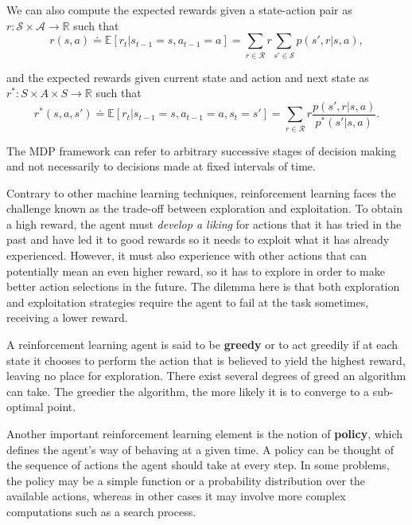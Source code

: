 \documentclass[11pt]{article}
\theoremstyle{definition}
\begin{document}
We can also compute the expected rewards given a state-action pair as $r: \mathcal{S} \times \mathcal{A} \rightarrow \mathbb{R}$ such that
\begin{equation*}
    r(s, a) \doteq \mathbb{E}[r_t | s_{t-1} = s, a_{t-1} = a] = \sum_{r \in \mathcal{R}} r \sum_{s' \in \mathcal{S}} p(s', r | s, a),
\end{equation*}

and the expected rewards given current state and action and next state as $r^* : S \times A \times S \rightarrow \mathbb{R}$ such that
\begin{equation*}
    r^*(s, a, s') \doteq \mathbb{E}[r_t | s_{t-1} = s, a_{t-1} = a, s_t = s'] = \sum_{r \in \mathcal{R}} r \dfrac{p(s', r | s, a)}{p^*(s' | s, a)}.
\end{equation*}

The MDP framework can refer to arbitrary successive stages of decision making and not necessarily to decisions made at fixed intervals of time. 

Contrary to other machine learning techniques, reinforcement learning faces the challenge known as the trade-off between exploration and exploitation. To obtain a high reward, the agent must \textit{develop a liking} for actions that it has tried in the past and have led it to good rewards so it needs to exploit what it has already experienced. However, it must also experience with other actions that can potentially mean an even higher reward, so it has to explore in order to make better action selections in the future. The dilemma here is that both exploration and exploitation strategies require the agent to fail at the task sometimes, receiving a lower reward.

A reinforcement learning agent is said to be \textbf{greedy} or to act greedily if at each state it chooses to perform the action that is believed to yield the highest reward, leaving no place for exploration. There exist several degrees of greed an algorithm can take. The greedier the algorithm, the more likely it is to converge to a sub-optimal point.

Another important reinforcement learning element is the notion of \textbf{policy}, which defines the agent's way of behaving at a given time. A policy can be thought of the sequence of actions the agent should take at every step. In some problems, the policy may be a simple function or a probability distribution over the available actions, whereas in other cases it may involve more complex computations such as a search process.
\end{document}

